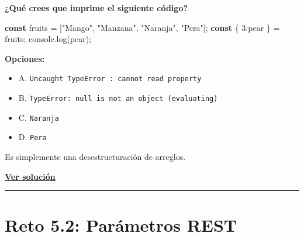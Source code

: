 \documentclass[
  letterpaper,
  DIV=11,
  numbers=noendperiod]{scrreprt}
\newenvironment{Shaded}{\begin{snugshade}}{\end{snugshade}}
\newcommand{\BuiltInTok}[1]{\textcolor[rgb]{0.00,0.23,0.31}{#1}}
\newcommand{\DecValTok}[1]{\textcolor[rgb]{0.68,0.00,0.00}{#1}}
\newcommand{\FunctionTok}[1]{\textcolor[rgb]{0.28,0.35,0.67}{#1}}
\newcommand{\KeywordTok}[1]{\textcolor[rgb]{0.00,0.23,0.31}{\textbf{#1}}}
\newcommand{\NormalTok}[1]{\textcolor[rgb]{0.00,0.23,0.31}{#1}}
\newcommand{\OperatorTok}[1]{\textcolor[rgb]{0.37,0.37,0.37}{#1}}
\newcommand{\StringTok}[1]{\textcolor[rgb]{0.13,0.47,0.30}{#1}}
\providecommand{\tightlist}{%
  \setlength{\itemsep}{0pt}\setlength{\parskip}{0pt}}
\begin{document}
\textbf{¿Qué crees que imprime el siguiente código?}

\begin{Shaded}
\begin{Highlighting}[]
\KeywordTok{const}\NormalTok{ fruits }\OperatorTok{=}\NormalTok{ [}\StringTok{"Mango"}\OperatorTok{,} \StringTok{"Manzana"}\OperatorTok{,} \StringTok{"Naranja"}\OperatorTok{,} \StringTok{"Pera"}\NormalTok{]}\OperatorTok{;}
\KeywordTok{const}\NormalTok{ \{ }\DecValTok{3}\OperatorTok{:}\NormalTok{pear \} }\OperatorTok{=}\NormalTok{ fruits}\OperatorTok{;}
\BuiltInTok{console}\OperatorTok{.}\FunctionTok{log}\NormalTok{(pear)}\OperatorTok{;}
\end{Highlighting}
\end{Shaded}

\textbf{Opciones:}

\begin{itemize}
\tightlist
\item
  A. \texttt{Uncaught\ TypeError\ :\ cannot\ read\ property}
\item
  B. \texttt{TypeError:\ null\ is\ not\ an\ object\ (evaluating)}
\item
  C. \texttt{Naranja}
\item
  D. \texttt{Pera}
\end{itemize}

\begin{tcolorbox}[enhanced jigsaw, left=2mm, toprule=.15mm, leftrule=.75mm, breakable, colback=white, coltitle=black, bottomtitle=1mm, arc=.35mm, rightrule=.15mm, colframe=quarto-callout-tip-color-frame, opacitybacktitle=0.6, toptitle=1mm, opacityback=0, titlerule=0mm, title=\textcolor{quarto-callout-tip-color}{\faLightbulb}\hspace{0.5em}{Pista}, bottomrule=.15mm, colbacktitle=quarto-callout-tip-color!10!white]

Es simplemente una desestructuración de arreglos.

\end{tcolorbox}

\textbf{\hyperref[sec-sol-cap5-reto1]{Ver solución}}

\begin{center}\rule{0.5\linewidth}{0.5pt}\end{center}

\section{Reto 5.2: Parámetros REST}\label{sec-cap5-reto2}
\end{document}
